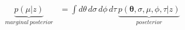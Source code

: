 \documentclass[varwidth=\linewidth]{standalone}
\begin{document}
$$\begin{aligned}
\underset{marginal\ posterior}{\underbrace{p(\mu | z)}} &= \int\! d\theta\, d\sigma\, d\phi\, d\tau\, 
\underset{poseterior}{\underbrace{p(\mathbf{\theta}, \sigma, \mu, \phi, \tau|z)}}
\end{aligned}$$
\end{document}
